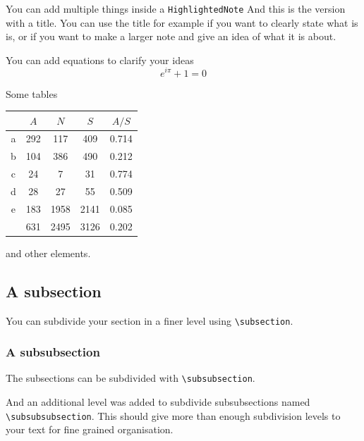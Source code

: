 \documentclass{project-logbook}
\begin{document}
	\begin{HighlightedNote}{You can add multiple things inside a \texttt{HighlightedNote}}
		And this is the version with a title. You can use the title for example if you want to clearly state what is is, or if you want to make a larger note and give an idea of what it is about.
		
		You can add equations to clarify your ideas
		\begin{equation}
			e^{i\pi} + 1 = 0
		\end{equation}
		
		Some tables
		
		\begin{center}
			\begin{tabular}{ccccc}
            			{}  & \multicolumn{1}{c}{$A$} & \multicolumn{1}{c}{$N$} & \multicolumn{1}{c}{$S$} & \multicolumn{1}{c}{$A/S$} \\
            			\midrule
            			a & 292 & 117   & 409   & 0.714 \\
            			b & 104 & 386   & 490   & 0.212 \\
            			c & 24  & 7     & 31    & 0.774 \\
            			d & 28  & 27    & 55    & 0.509 \\
            			e & 183 & 1958  & 2141  & 0.085 \\
            			\midrule
            			& 631 & 2495 & 3126 & 0.202 \\
        			\end{tabular}
    		\end{center}
		and other elements.
    
	\end{HighlightedNote}

	\subsection{A subsection}
		You can subdivide your section in a finer level using \texttt{\textbackslash subsection}.
		
		\subsubsection{A subsubsection}
			The subsections can be subdivided with \texttt{\textbackslash subsubsection}.
			
				And an additional level was added to subdivide subsubsections named \texttt{\textbackslash subsubsubsection}. This should give more than enough subdivision levels to your text for fine grained organisation.
			
\end{document}
